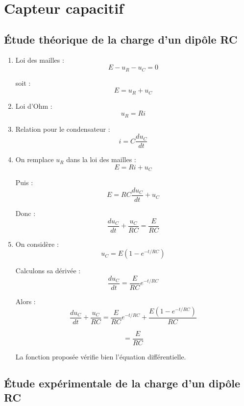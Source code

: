 \documentclass[a4paper,11pt,fleqn]{scrartcl}
\begin{document}
\section{Capteur capacitif}

\subsection{Étude théorique de la charge d'un dipôle RC}

\begin{enumerate}
    \item Loi des mailles :
    \[
    E-u_R-u_C=0
    \]

    soit :
    \[
    E=u_R+u_C
    \]

    \item Loi d'Ohm :
    \[
    u_R=Ri
    \]

    \item Relation pour le condensateur :
    \[
    i=C\dfrac{du_C}{dt}
    \]

    \item On remplace $u_R$ dans la loi des mailles :
    \[
    E=Ri+u_C
    \]

    Puis :
    \[
    E=RC\dfrac{du_C}{dt}+u_C
    \]

    Donc :
    \[
    \dfrac{du_C}{dt}+\dfrac{u_C}{RC}
    =
    \dfrac{E}{RC}
    \]

    \item On considère :
    \[
    u_C=E\left(1-e^{-t/RC}\right)
    \]

    Calculons sa dérivée :
    \[
    \dfrac{du_C}{dt}
    =
    \dfrac{E}{RC}e^{-t/RC}
    \]

    Alors :
    \[
    \dfrac{du_C}{dt}+\dfrac{u_C}{RC}
    =
    \dfrac{E}{RC}e^{-t/RC}
    +
    \dfrac{E(1-e^{-t/RC})}{RC}
    \]

    \[
    =
    \dfrac{E}{RC}
    \]

    La fonction proposée vérifie bien l'équation différentielle.
\end{enumerate}

\subsection{Étude expérimentale de la charge d'un dipôle RC}
\end{document}
